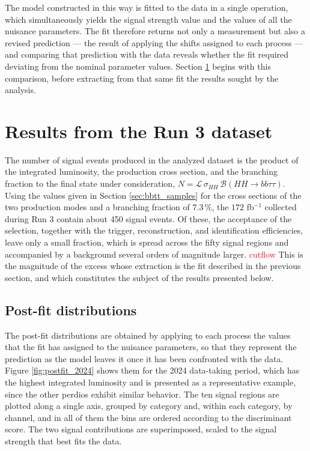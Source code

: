 The model constructed in this way is fitted to the data in a single operation, which simultaneously yields the signal strength value and the values of all the nuisance parameters. The fit therefore returns not only a measurement but also a revised prediction — the result of applying the shifts assigned to each process — and comparing that prediction with the data reveals whether the fit required deviating from the nominal parameter values. Section \ref{sec:bbtt_results} begins with this comparison, before extracting from that same fit the results sought by the analysis.


\section{Results from the Run 3 dataset}
\label{sec:bbtt_results}
%
The number of signal events produced in the analyzed dataset is the product of the integrated luminosity, the production cross section, and the branching fraction to the final state under consideration, $N = \mathcal{L}\,\sigma_{HH}\,\mathcal{B}(HH\to bb\tau\tau)$. Using the values given in Section \ref{sec:bbtt_samples} for the cross sections of the two production modes and a branching fraction of $7.3\,\%$, the $172$ fb$^{-1}$ collected during Run 3 contain about 450 signal events. Of these, the acceptance of the selection, together with the trigger, reconstruction, and identification efficiencies, leave only a small fraction, which is spread across the fifty signal regions and accompanied by a background several orders of magnitude larger. \textcolor{red}{cutflow} This is the magnitude of the excess whose extraction is the fit described in the previous section, and which constitutes the subject of the results presented below.

\subsection{Post-fit distributions}
%
The post-fit distributions are obtained by applying to each process the values that the fit has assigned to the nuisance parameters, so that they represent the prediction as the model leaves it once it has been confronted with the data. Figure \ref{fig:postfit_2024} shows them for the 2024 data-taking period, which has the highest integrated luminosity and is presented as a representative example, since the other perdios exhibit similar behavior. The ten signal regions are plotted along a single axis, grouped by category and, within each category, by channel, and in all of them the bins are ordered according to the discriminant score. The two signal contributions are superimposed, scaled to the signal strength that best fits the data.


